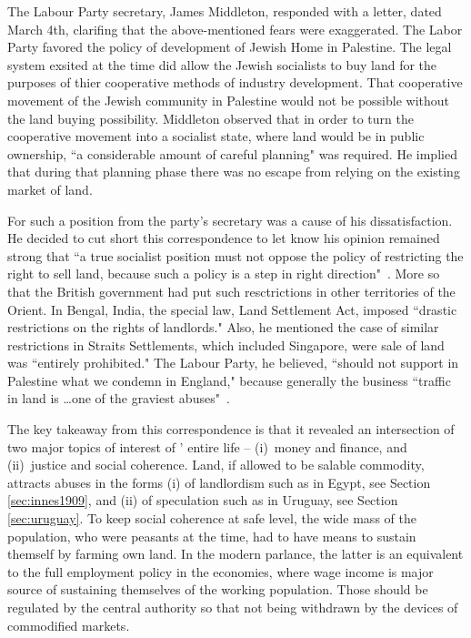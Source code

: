The Labour Party secretary, James Middleton, responded with a letter, dated March 4th, clarifing that the above-mentioned fears were exaggerated. The Labor Party favored the policy of development of Jewish Home in Palestine. The legal system exsited at the time did allow the Jewish socialists to buy land for the purposes of thier cooperative methods of industry development. That cooperative movement of the Jewish community in Palestine would not be possible without the land buying possibility. Middleton observed that in order to turn the cooperative movement into a socialist state, where land would be in public ownership, ``a considerable amount of careful planning" was required. He implied that during that planning phase there was no escape from relying on the existing market of land. 

For \citeauthor{innes1940} such a position from the party's secretary was a cause of his dissatisfaction. He decided to cut short this correspondence to let know his opinion remained strong that ``a true socialist position must not oppose the policy of restricting the right to sell land, because such a policy is a step in right direction"~\citep{innes1940}. More so that the British government had put such resctrictions in other territories of the Orient. In Bengal, India, the special law, Land Settlement Act, imposed ``drastic restrictions on the rights of landlords." Also, he mentioned the case of similar restrictions in Straits Settlements, which included Singapore, were sale of land was ``entirely prohibited." The Labour Party, he believed, ``should not support in Palestine what we condemn in England," because generally the business ``traffic in land is \dots one of the graviest abuses"~\citep{innes1940}.

The key takeaway from this correspondence is that it revealed an intersection of two major topics of interest of \citeauthor{innes1940}' entire life -- (i)~money and finance, and (ii)~justice  and social coherence. Land, if allowed to be salable commodity, attracts abuses in the forms (i) of landlordism such as in Egypt, see Section \ref{sec:innes1909}, and (ii) of speculation such as in Uruguay, see Section \ref{sec:uruguay}. To keep social coherence at safe level, the wide mass of the population, who were peasants at the time, had to have means to sustain themself by farming own land. In the modern parlance, the latter is an equivalent to the full employment policy in the economies, where wage income is major source of sustaining themselves of the working population. Those should be regulated by the central authority so that not being withdrawn by the devices of commodified markets.

